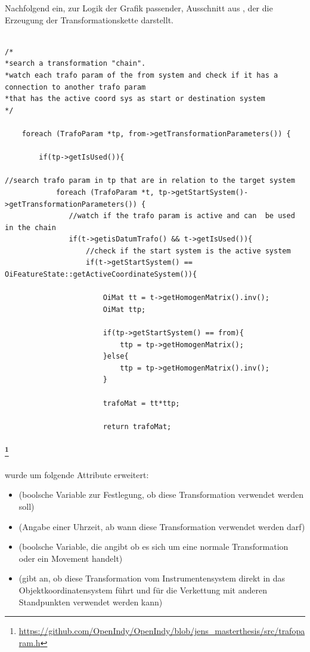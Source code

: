 Nachfolgend ein, zur Logik der Grafik passender, Ausschnitt aus , der die Erzeugung der Transformationskette darstellt.

\begin{lstlisting}[caption={Auszug aus \cFunc{OiMat getTransformationMatrix(CoordinateSystem *from)}},captionpos=t]

/*
*search a transformation "chain".
*watch each trafo param of the from system and check if it has a connection to another trafo param
*that has the active coord sys as start or destination system
*/

	foreach (TrafoParam *tp, from->getTransformationParameters()) {

    	if(tp->getIsUsed()){

//search trafo param in tp that are in relation to the target system
        	foreach (TrafoParam *t, tp->getStartSystem()->getTransformationParameters()) {
               //watch if the trafo param is active and can  be used in the chain
               if(t->getisDatumTrafo() && t->getIsUsed()){
                   //check if the start system is the active system
                   if(t->getStartSystem() == OiFeatureState::getActiveCoordinateSystem()){

                       OiMat tt = t->getHomogenMatrix().inv();
                       OiMat ttp;

                       if(tp->getStartSystem() == from){
                           ttp = tp->getHomogenMatrix();
                       }else{
                           ttp = tp->getHomogenMatrix().inv();
                       }

                       trafoMat = tt*ttp;

                       return trafoMat;
\end{lstlisting}

\paragraph{\protect\footnote{\url{https://github.com/OpenIndy/OpenIndy/blob/jens_masterthesis/src/trafoparam.h}}} wurde um folgende Attribute erweitert:\\
\begin{itemize}
	\item {} (boolsche Variable zur Festlegung, ob diese Transformation verwendet werden soll)
	\item {} (Angabe einer Uhrzeit, ab wann diese Transformation verwendet werden darf)
	\item {} (boolsche Variable, die angibt ob es sich um eine normale Transformation oder ein Movement handelt)
	\item {} (gibt an, ob diese Transformation vom Instrumentensystem direkt in das Objektkoordinatensystem führt und für die Verkettung mit anderen Standpunkten verwendet werden kann)
\end{itemize}

